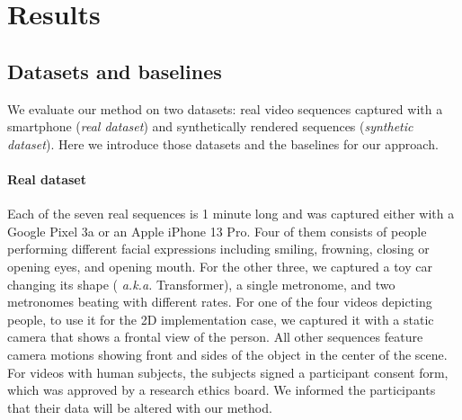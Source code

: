 

\section{Results}
  \label{sec:conerf-results}

  \subsection{Datasets and baselines}

    We evaluate our method on two datasets: real video sequences captured with
    a smartphone ({\it real dataset}) and synthetically rendered sequences
    ({\it synthetic dataset}).
    Here we introduce those datasets and the baselines for our approach.

    \paragraph{Real dataset}
      Each of the seven real sequences is 1 minute long and was captured
      either with a Google Pixel 3a or an Apple iPhone 13 Pro.
      Four of them consists of people performing different facial expressions
      including smiling, frowning, closing or opening eyes, and opening mouth.
      For the other three, we captured a toy car changing its shape ({\it
      a.k.a.
        }
      Transformer), a single metronome, and two metronomes beating with
      different rates.
      For one of the four videos depicting people, to use it for the 2D
      implementation case, we captured it with a static camera that shows a
      frontal view of the person.
      All other sequences feature camera motions showing front and sides of
      the object in the center of the scene.
      For videos with human subjects, the subjects signed a participant
      consent form, which was approved by a research ethics board.
      We informed the participants that their data will be altered with our
      method.

